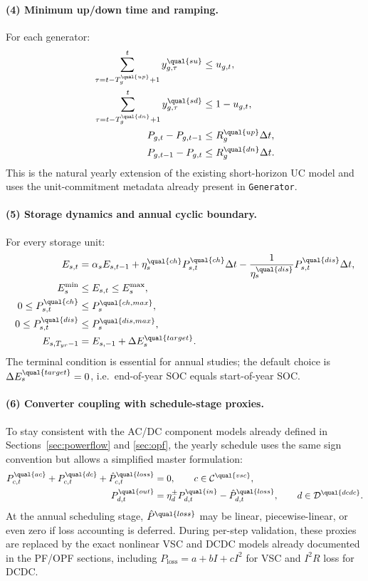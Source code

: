 \paragraph{(4) Minimum up/down time and ramping.}
For each generator:
\begin{align}
\sum_{\tau=t-T_g^{\qual{up}}+1}^{t} y_{g,\tau}^{\qual{su}} &\le u_{g,t}, \\
\sum_{\tau=t-T_g^{\qual{dn}}+1}^{t} y_{g,\tau}^{\qual{sd}} &\le 1-u_{g,t}, \\
P_{g,t}-P_{g,t-1} &\le R_g^{\qual{up}}\Delta t, \\
P_{g,t-1}-P_{g,t} &\le R_g^{\qual{dn}}\Delta t.
\label{eq:annual-ramping-updown}
\end{align}
This is the natural yearly extension of the existing short-horizon UC model and
uses the unit-commitment metadata already present in \texttt{Generator}.

\paragraph{(5) Storage dynamics and annual cyclic boundary.}
For every storage unit:
\begin{align}
E_{s,t} &= \alpha_s E_{s,t-1}
+ \eta_s^{\qual{ch}} P_{s,t}^{\qual{ch}}\Delta t
- \frac{1}{\eta_s^{\qual{dis}}} P_{s,t}^{\qual{dis}}\Delta t, \\
E_s^{\min} &\le E_{s,t} \le E_s^{\max}, \\
0 \le P_{s,t}^{\qual{ch}} &\le P_s^{\qual{ch,max}}, \\
0 \le P_{s,t}^{\qual{dis}} &\le P_s^{\qual{dis,max}}, \\
E_{s,T_{yr}-1} &= E_{s,-1} + \Delta E_s^{\qual{target}}.
\label{eq:annual-storage}
\end{align}
The terminal condition is essential for annual studies; the default choice is
\(\Delta E_s^{\qual{target}}=0\), i.e.\ end-of-year SOC equals start-of-year SOC.

\paragraph{(6) Converter coupling with schedule-stage proxies.}
To stay consistent with the AC/DC component models already defined in
Sections~\ref{sec:powerflow} and \ref{sec:opf}, the yearly schedule uses the same
sign convention but allows a simplified master formulation:
\begin{align}
P_{c,t}^{\qual{ac}} + P_{c,t}^{\qual{dc}} + \hat P_{c,t}^{\qual{loss}} &= 0,
\qquad c\in\mathcal{C}^{\qual{vsc}}, \\
P_{d,t}^{\qual{out}} &= \eta_d^{\pm} P_{d,t}^{\qual{in}} - \hat P_{d,t}^{\qual{loss}},
\qquad d\in\mathcal{D}^{\qual{dcdc}}.
\label{eq:annual-converter-proxy}
\end{align}
At the annual scheduling stage, \(\hat P^{\qual{loss}}\) may be linear,
piecewise-linear, or even zero if loss accounting is deferred.  During per-step
validation, these proxies are replaced by the exact nonlinear VSC and DCDC
models already documented in the PF/OPF sections, including
\(P_{\mathrm{loss}} = a + bI + cI^2\) for VSC and \(I^2R\) loss for DCDC.

